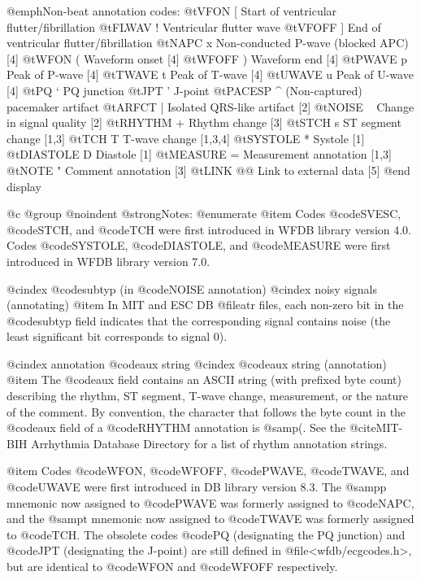 {{{{{{{{{@emph{Non-beat annotation codes:}
@t{VFON     [  } Start of ventricular flutter/fibrillation
@t{FLWAV    !  } Ventricular flutter wave
@t{VFOFF    ]  } End of ventricular flutter/fibrillation
@t{NAPC     x  } Non-conducted P-wave (blocked APC) [4]
@t{WFON     (  } Waveform onset [4]
@t{WFOFF    )  } Waveform end [4]
@t{PWAVE    p  } Peak of P-wave [4]
@t{TWAVE    t  } Peak of T-wave [4]
@t{UWAVE    u  } Peak of U-wave [4]
@t{PQ       `  } PQ junction
@t{JPT      '  } J-point
@t{PACESP   ^  } (Non-captured) pacemaker artifact
@t{ARFCT    |  } Isolated QRS-like artifact [2]
@t{NOISE    ~  } Change in signal quality [2]
@t{RHYTHM   +  } Rhythm change [3]
@t{STCH     s  } ST segment change [1,3]
@t{TCH      T  } T-wave change [1,3,4]
@t{SYSTOLE  *  } Systole [1]
@t{DIASTOLE D  } Diastole [1]
@t{MEASURE  =  } Measurement annotation [1,3]
@t{NOTE     "  } Comment annotation [3]
@t{LINK     @@  } Link to external data [5]
@end display

@c @group
@noindent
@strong{Notes:}
@enumerate
@item
Codes @code{SVESC}, @code{STCH}, and @code{TCH} were first introduced
in WFDB library version 4.0.  Codes @code{SYSTOLE}, @code{DIASTOLE}, and
@code{MEASURE} were first introduced in WFDB library version 7.0.

@cindex @code{subtyp} (in @code{NOISE} annotation)
@cindex noisy signals (annotating)
@item
In MIT and ESC DB @file{atr} files, each non-zero bit in the @code{subtyp}
field indicates that the corresponding signal contains noise (the least
significant bit corresponds to signal 0).

@cindex annotation @code{aux} string
@cindex @code{aux} string (annotation)
@item
The @code{aux} field contains an ASCII string (with prefixed byte count)
describing the rhythm, ST segment, T-wave change, measurement, or the
nature of the comment.  By convention, the character that follows the
byte count in the @code{aux} field of a @code{RHYTHM} annotation is @samp{(}.
See the @cite{MIT-BIH Arrhythmia Database Directory} for a list of rhythm
annotation strings.

@item
Codes @code{WFON}, @code{WFOFF}, @code{PWAVE}, @code{TWAVE}, and
@code{UWAVE} were first introduced in DB library version 8.3.  The
@samp{p} mnemonic now assigned to @code{PWAVE} was formerly assigned to
@code{NAPC}, and the @samp{t} mnemonic now assigned to @code{TWAVE} was
formerly assigned to @code{TCH}.  The obsolete codes @code{PQ}
(designating the PQ junction) and @code{JPT} (designating the J-point)
are still defined in @file{<wfdb/ecgcodes.h>}, but are identical to
@code{WFON} and @code{WFOFF} respectively.

}}}}}}}}}
